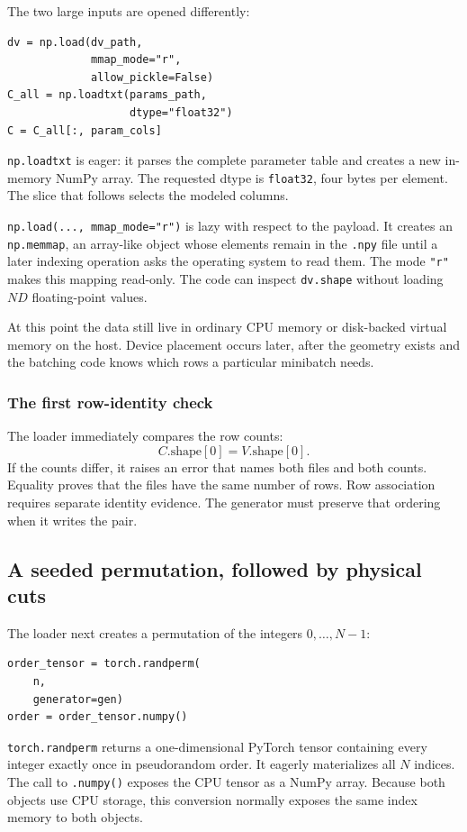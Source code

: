 \documentclass[10pt,aps,prd,twocolumn,nofootinbib]{revtex4-2}
\newcommand{\code}[1]{\texttt{#1}}
\begin{document}
The two large inputs are opened differently:
\begin{verbatim}
dv = np.load(dv_path,
             mmap_mode="r",
             allow_pickle=False)
C_all = np.loadtxt(params_path,
                   dtype="float32")
C = C_all[:, param_cols]
\end{verbatim}

\code{np.loadtxt} is eager: it parses the complete parameter table and creates
a new in-memory NumPy array.  The requested dtype is \code{float32}, four
bytes per element.  The slice that follows selects the modeled columns.

\code{np.load(..., mmap\_mode="r")} is lazy with respect to the payload.  It
creates an \code{np.memmap}, an array-like object whose elements remain in the
\code{.npy} file until a later indexing operation asks the operating system
to read them.  The mode \code{"r"} makes this mapping read-only.  The code can
inspect \code{dv.shape} without loading $N D$ floating-point values.

At this point the data still live in ordinary CPU memory or disk-backed virtual
memory on the host.  Device
placement occurs later, after the geometry exists and the batching code knows
which rows a particular minibatch needs.

\subsubsection{The first row-identity check}

The loader immediately compares the row counts:
\begin{equation}
  C.\mathrm{shape}[0] = V.\mathrm{shape}[0].
\end{equation}
If the counts differ, it raises an error that names both files and both
counts.  Equality proves that the files have the same number of rows.  Row
association requires separate identity evidence.  The generator must preserve
that ordering when it writes the pair.

\subsection{A seeded permutation, followed by physical cuts}

The loader next creates a permutation of the integers $0,\ldots,N-1$:
\begin{verbatim}
order_tensor = torch.randperm(
    n,
    generator=gen)
order = order_tensor.numpy()
\end{verbatim}
\code{torch.randperm} returns a one-dimensional PyTorch tensor containing
every integer exactly once in pseudorandom order.  It eagerly materializes all
$N$ indices.  The call to
\code{.numpy()} exposes the CPU tensor as a NumPy array.  Because both objects
use CPU storage, this conversion normally exposes the same index memory to
both objects.
\end{document}
